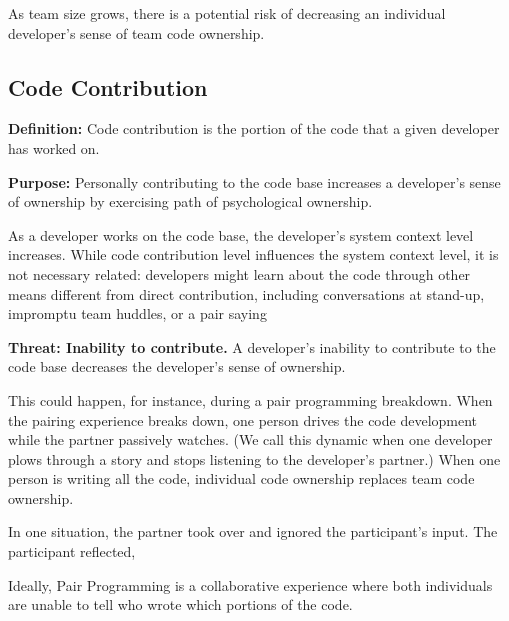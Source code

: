As team size grows, there is a potential risk of decreasing an individual developer's sense of team code ownership. 

\subsection{Code Contribution}
\textbf{Definition:} Code contribution is the portion of the code that a given developer has worked on. 

\textbf{Purpose:} Personally contributing to the code base increases a developer's sense of ownership by exercising  path of psychological ownership. 

As a developer works on the code base, the developer's system context level increases. While code contribution level influences the system context level, it is not necessary related: developers might learn about the code through other means different from direct contribution, including conversations at stand-up, impromptu team huddles, or a pair saying 

\textbf{Threat: Inability to contribute.}  A developer's inability to contribute to the code base decreases the developer's sense of ownership. 

This could happen, for instance, during a pair programming breakdown. When the pairing experience breaks down, one person drives the code development while the partner passively watches. (We call this dynamic  when one developer plows through a story and stops listening to the developer's partner.)  When one person is writing all the code, individual code ownership replaces team code ownership.  

In one situation, the partner took over and ignored the participant's input. The participant reflected,  



Ideally, Pair Programming is a collaborative experience where both individuals are unable to tell who wrote which portions of the code. 

